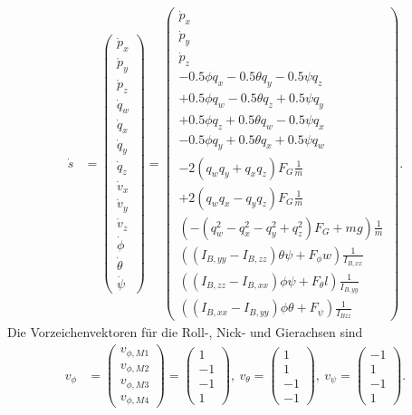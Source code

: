 \begin{align}\label{zustandsvektor:zustandsvektor}
	\dot{s} &= 
	\begin{pmatrix}
		\dot{p}_x\\
		\dot{p}_y\\
		\dot{p}_z\\
		\dot{q}_w\\
		\dot{q}_x\\
		\dot{q}_y\\
		\dot{q}_z\\
		\dot{v}_x\\
		\dot{v}_y\\
		\dot{v}_z\\
		\dot{\phi}\\
		\dot{\theta}\\
		\dot{\psi}
	\end{pmatrix} = 
	\begin{pmatrix}
		\dot{p}_x\\
		\dot{p}_y\\
		\dot{p}_z\\
		-0.5\phi q_x - 0.5\theta q_y - 0.5\psi q_z\\
		+0.5\phi q_w - 0.5\theta q_z + 0.5\psi q_y\\
		+0.5\phi q_z + 0.5\theta q_w - 0.5\psi q_x\\
		-0.5\phi q_y + 0.5\theta q_x + 0.5\psi q_w\\
		-2(q_wq_y + q_xq_z) F_G \frac{1}{m}\\
		+2(q_wq_x - q_yq_z) F_G \frac{1}{m}\\
		(-(q_w^2-q_x^2-q_y^2+q_z^2) F_G + mg) \frac{1}{m}\\
		((I_{B,yy} - I_{B,zz}) \theta \psi + F_{\phi} w) \frac{1}{I_{B,xx}}\\
		((I_{B,zz} - I_{B,xx}) \phi \psi + F_{\theta} l) \frac{1}{I_{B,yy}}\\
		((I_{B,xx} - I_{B,yy}) \phi \theta + F_{\psi})\frac{1}{I_{Bzz}}
	\end{pmatrix}.
\end{align}
Die Vorzeichenvektoren für die Roll-, Nick- und Gierachsen sind
\begin{align}
	v_{\phi} &= \begin{pmatrix}
		v_{\phi, M1}\\
		v_{\phi, M2}\\
		v_{\phi, M3}\\
		v_{\phi, M4}
	\end{pmatrix} =
	\begin{pmatrix}
		1\\
		-1\\
		-1\\
		1
	\end{pmatrix},\
	v_{\theta} =
	\begin{pmatrix}
		1\\
		1\\
		-1\\
		-1
	\end{pmatrix},\
	v_{\psi} =
	\begin{pmatrix}
		-1\\
		1\\
		-1\\
		1
	\end{pmatrix}.
\end{align}

